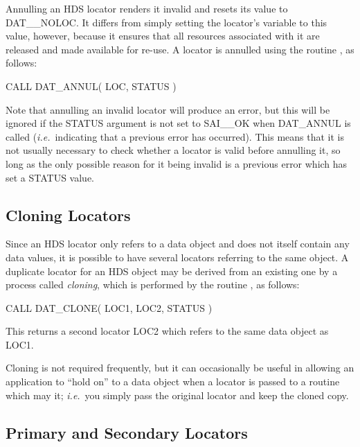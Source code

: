 \documentclass[twoside,11pt]{starlink}
\providecommand{\qt}[1]{``#1''}
\providecommand{\st}[1]{{\emph{#1}}}
\begin{document}
Annulling an HDS locator renders it invalid and resets its value to
DAT\_\_NOLOC.  It differs from simply setting the locator's variable
to this value, however, because it ensures that all resources
associated with it are released and made available for re-use. A
locator is annulled using the routine ,
as follows:

\begin{small}
\begin{terminalv}
CALL DAT_ANNUL( LOC, STATUS )
\end{terminalv}
\end{small}

Note that annulling an invalid locator will produce an error, but this
will be ignored if the STATUS argument is not set to SAI\_\_OK when
DAT\_ANNUL is called (\st{i.e.}\ indicating that a previous error has
occurred). This means that it is not usually necessary to check
whether a locator is valid before annulling it, so long as the only
possible reason for it being invalid is a previous error which has set
a STATUS value.

\subsection{Cloning Locators}

Since an HDS locator only refers to a data object and does not itself
contain any data values, it is possible to have several locators
referring to the same object.  A duplicate locator for an HDS object
may be derived from an existing one by a process called \st{cloning},
which is performed by the routine , as
follows:

\begin{small}
\begin{terminalv}
CALL DAT_CLONE( LOC1, LOC2, STATUS )
\end{terminalv}
\end{small}

This returns a second locator LOC2 which refers to the same data
object as LOC1.

Cloning is not required frequently, but it can occasionally be useful
in allowing an application to \qt{hold on} to a data object when a
locator is passed to a routine which may 
it; \st{i.e.}\ you simply pass the original locator and keep the
cloned copy.

\subsection{\label{sect:primary}Primary and Secondary Locators}
\end{document}
